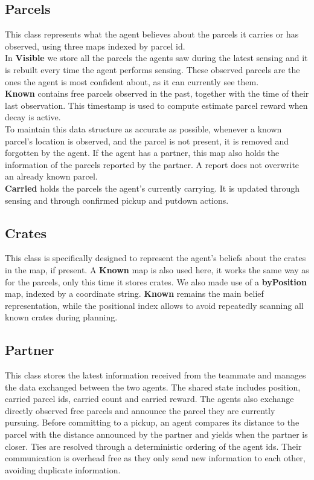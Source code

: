 \documentclass[11pt,a4paper]{article}
\begin{document}
\subsection{Parcels}
This class represents what the agent believes about the parcels it carries or has observed, using three maps indexed by parcel id.
\\In \textbf{Visible} we store all the parcels the agents saw during the latest sensing and it is rebuilt every time the agent performs sensing.
These observed parcels are the ones the agent is most confident about, as it can currently see them.
\\\textbf{Known} contains free parcels observed in the past, together with the time of their last observation.
This timestamp is used to compute estimate parcel reward when decay is active.
\\To maintain this data structure as accurate as possible, whenever a known parcel's location is observed, and the parcel is not present, it is removed and forgotten by the agent.
If the agent has a partner, this map also holds the information of the parcels reported by the partner. A report does not overwrite an already known parcel.
\\\textbf{Carried} holds the parcels the agent's currently carrying. 
It is updated through sensing and through confirmed pickup and putdown actions.

\subsection{Crates}
This class is specifically designed to represent the agent's beliefs about the crates in the map, if present.
A \textbf{Known} map is also used here, it works the same way as for the parcels, only this time it stores crates.
We also made use of a \textbf{byPosition} map, indexed by a coordinate string.
\textbf{Known} remains the main belief representation, while the positional index allows to avoid repeatedly scanning all known crates during planning.

\subsection{Partner}
This class stores the latest information received from the teammate and manages the data exchanged between the two agents. 
The shared state includes position, carried parcel ids, carried count and carried reward. 
The agents also exchange directly observed free parcels and announce the parcel they are currently pursuing.
Before committing to a pickup, an agent compares its distance to the parcel with the distance announced by the partner and yields when the partner is closer.
Ties are resolved through a deterministic ordering of the agent ids.
Their communication is overhead free as they only send new information to each other, avoiding duplicate information.
\end{document}
